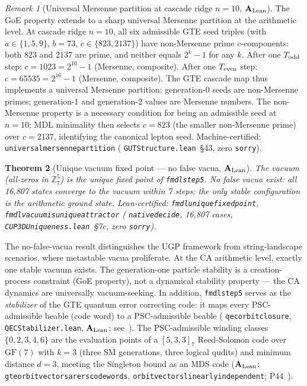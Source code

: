 \documentclass[11pt]{article}
\newtheorem{theorem}{Theorem}[section]
\theoremstyle{remark}
\newtheorem{remark}[theorem]{Remark}
\newcommand{\lean}[1]{%
  \penalty-100
  \begingroup\def\_{\textunderscore\allowbreak}\texttt{#1}\endgroup}
\newcommand{\CatAL}{\ensuremath{\textbf{A}_{\rm Lean}}}
\begin{document}
\begin{remark}[Universal Mersenne partition at cascade ridge $n=10$, $\CatAL$]
\label{rem:mersenne_partition}
The GoE property extends to a sharp universal Mersenne partition at the arithmetic level.
At cascade ridge $n=10$, all six admissible GTE seed triples (with $a \in \{1,5,9\}$, $b=73$, $c \in \{823, 2137\}$) have non-Mersenne prime $c$-components: both $823$ and $2137$ are prime, and neither equals $2^k-1$ for any $k$.
After one $T_{\rm odd}$ step: $c = 1023 = 2^{10}-1$ (Mersenne, composite).
After one $T_{\rm even}$ step: $c = 65535 = 2^{16}-1$ (Mersenne, composite).
The GTE cascade map thus implements a universal Mersenne partition: generation-0 seeds are non-Mersenne primes; generation-1 and generation-2 values are Mersenne numbers.
The non-Mersenne property is a necessary condition for being an admissible seed at $n=10$; MDL minimality then selects $c = 823$ (the smaller non-Mersenne prime) over $c = 2137$, identifying the canonical lepton seed.
Machine-certified: \lean{universal\_mersenne\_partition} (\lean{GUTStructure.lean}~\S43, zero \texttt{sorry}).
\end{remark}

\begin{theorem}[Unique vacuum fixed point — no false vacua, $\CatAL$]
\label{thm:unique_vacuum}
The vacuum (all-zeros in $\mathbb{Z}_7^5$) is the \emph{unique} fixed point of
\lean{fmdl\_step5}. No false vacua exist: all 16{,}807 states converge to the vacuum
within 7 steps; the only stable configuration is the arithmetic ground state.
Lean-certified: \lean{fmdl\_unique\_fixed\_point}, \lean{fmdl\_vacuum\_is\_unique\_attractor}
(\lean{native\_decide}, 16{,}807 cases, \lean{CUP3DUniqueness.lean}~\S7c, zero \texttt{sorry}).
\end{theorem}

The no-false-vacua result distinguishes the UGP framework from string-landscape scenarios,
where metastable vacua proliferate. At the CA arithmetic level, exactly one stable vacuum
exists. The generation-one particle stability is a creation-process constraint (GoE property),
not a dynamical stability property --- the CA dynamics are universally vacuum-seeking.
In addition, \lean{fmdl\_step5} serves as the \emph{stabilizer} of the GTE quantum error
correcting code: it maps every PSC-admissible beable (code word) to a PSC-admissible beable
(\lean{qec\_orbit\_closure}, \lean{QECStabilizer.lean}, \CatAL; see~\cite{SpivackGTEMobius}).
The PSC-admissible winding classes $\{0,2,3,4,6\}$ are the evaluation points of a
$[5,3,3]_7$ Reed-Solomon code over $\mathrm{GF}(7)$ with $k=3$ (three SM generations,
three logical qudits) and minimum distance $d=3$, meeting the Singleton bound as an MDS
code ($\CatAL$: \lean{gte\_orbit\_vectors\_are\_rs\_codewords},
\lean{orbit\_vectors\_linearly\_independent}; P44~\cite{SpivackQGR}).
\end{document}
